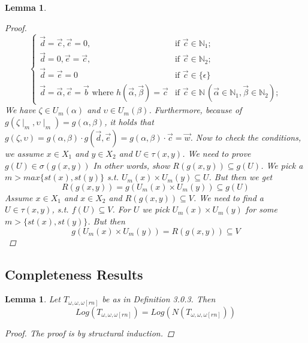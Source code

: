 \documentclass[12pt, a4paper]{scrartcl}
\newtheorem{lemma}[definition]{Lemma}
\begin{document}
\begin{lemma}
\begin{proof}
        \[
            \begin{cases}
            \vec{d} = \vec{c}, \vec{e} = 0, & \text{if }  \vec{c }\in \mathbb{N}_{1}; \\
            \vec{d} = 0, \vec{e} = \vec{c}, & \text{if }  \vec{c }\in \mathbb{N}_{2}; \\
            \vec{d} = \vec{e} = 0& \text{if } \vec{c }\in \{\epsilon\} \\
            \vec{d} = \vec{\alpha}, \vec{e} = \vec{b} \text{    where }h(\vec{\alpha},\vec{\beta}) = \vec{c} & \text{if } \vec{c } \in \mathbb{N} \, (\vec{\alpha} \in \mathbb{N}_1, \vec{\beta} \in \mathbb{N}_2);
            \end{cases}
        \] 
        \newline
        We have $\zeta \in U_m(\alpha)$ and $\upsilon \in U_m(\beta)$. Furthermore, because of $g(\zeta \mid_m, \upsilon \mid_m) = g(\alpha,\beta)$, it holds that $g(\zeta, \upsilon) = g(\alpha,\beta) \cdot g(\vec{d}, \vec{e}) = g(\alpha,\beta) \cdot \vec{c} = \vec{w}$. \newline \newline 
        Now to check the conditions, we assume $x \in X_1$ and $y \in X_2$ and $U \in \tau(x,y)$. We need to prove $g(U) \in \sigma(g(x,y))$ In other words, show $R(g(x,y)) \subseteq g(U)$. We pick a $m> max\{st(x),st(y)\}$ s.t. $U_m(x) \times U_m(y) \subseteq U$. But then we get 
        $$R(g(x,y)) = g(U_m(x) \times U_m(y)) \subseteq g(U)$$
        \newline
        Assume  $x \in X_1$ and $x \in X_2$ and $R(g(x,y)) \subseteq V$. We need to find a $U \in \tau(x,y)$, s.t. $f(U) \subseteq V$.
        For $U$ we pick $U_m(x) \times U_m(y)$ for some $m > \{st(x), st(y)\}$. But then 
        $$g(U_m(x) \times U_m(y)) = R(g(x,y)) \subseteq V$$

        \end{proof}
    \end{lemma}

    \subsection{Completeness Results}

    \begin{lemma}
    Let $T_{\omega,\omega,\omega[rn]}$ be as in Definition 3.0.3. Then 
    $$Log(T_{\omega,\omega,\omega[rn]}) = Log(N(T_{\omega,\omega,\omega[rn]}))$$
    \begin{proof}
            The proof is by structural induction.
    \end{proof}

    \end{lemma}
\end{document}
